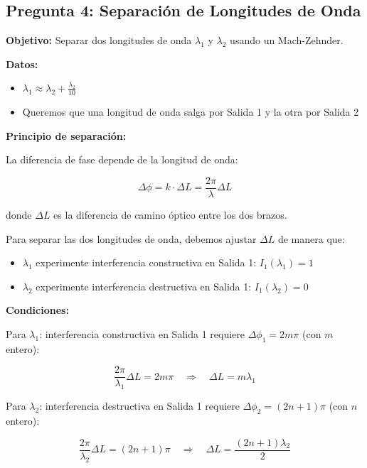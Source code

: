 \documentclass[12pt,a4paper]{article}
\begin{document}
\subsection{Pregunta 4: Separación de Longitudes de Onda}

\textbf{Objetivo:} Separar dos longitudes de onda $\lambda_1$ y $\lambda_2$ usando un Mach-Zehnder.

\textbf{Datos:}
\begin{itemize}
    \item $\lambda_1 \approx \lambda_2 + \frac{\lambda_2}{10}$
    \item Queremos que una longitud de onda salga por Salida 1 y la otra por Salida 2
\end{itemize}

\textbf{Principio de separación:}

La diferencia de fase depende de la longitud de onda:

\begin{equation}
    \Delta\phi = k \cdot \Delta L = \frac{2\pi}{\lambda} \Delta L
\end{equation}

donde $\Delta L$ es la diferencia de camino óptico entre los dos brazos.

Para separar las dos longitudes de onda, debemos ajustar $\Delta L$ de manera que:
\begin{itemize}
    \item $\lambda_1$ experimente interferencia constructiva en Salida 1: $I_1(\lambda_1) = 1$
    \item $\lambda_2$ experimente interferencia destructiva en Salida 1: $I_1(\lambda_2) = 0$
\end{itemize}

\textbf{Condiciones:}

Para $\lambda_1$: interferencia constructiva en Salida 1 requiere $\Delta\phi_1 = 2m\pi$ (con $m$ entero):

\begin{equation}
    \frac{2\pi}{\lambda_1} \Delta L = 2m\pi \quad \Rightarrow \quad \Delta L = m\lambda_1
\end{equation}

Para $\lambda_2$: interferencia destructiva en Salida 1 requiere $\Delta\phi_2 = (2n+1)\pi$ (con $n$ entero):

\begin{equation}
    \frac{2\pi}{\lambda_2} \Delta L = (2n+1)\pi \quad \Rightarrow \quad \Delta L = \frac{(2n+1)\lambda_2}{2}
\end{equation}
\end{document}

